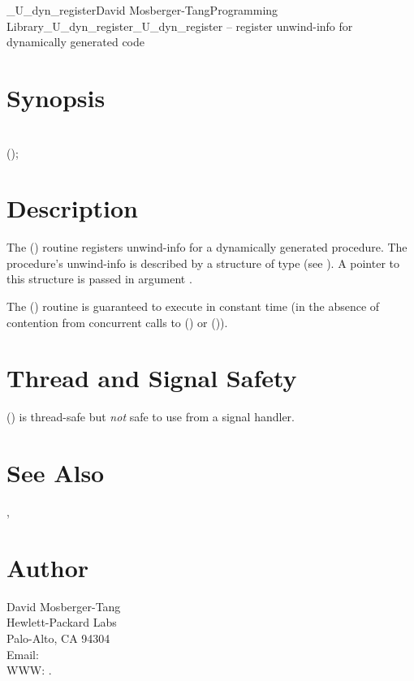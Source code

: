 \documentclass{article}
\begin{document}
\begin{Name}{3}{\_U\_dyn\_register}{David Mosberger-Tang}{Programming Library}{\_U\_dyn\_register}\_U\_dyn\_register -- register unwind-info for dynamically generated code
\end{Name}

\section{Synopsis}

\\

 ();\\

\section{Description}

The () routine registers unwind-info for a
dynamically generated procedure.  The procedure's unwind-info is
described by a structure of type  (see
).  A pointer to this structure is
passed in argument .

The () routine is guaranteed to execute in
constant time (in the absence of contention from concurrent calls to
() or ()).


\section{Thread and Signal Safety}

() is thread-safe but \emph{not} safe to use
from a signal handler.

\section{See Also}

, 

\section{Author}

\noindent
David Mosberger-Tang\\
Hewlett-Packard Labs\\
Palo-Alto, CA 94304\\
Email: \\
WWW: .
\LatexManEnd
\end{document}
